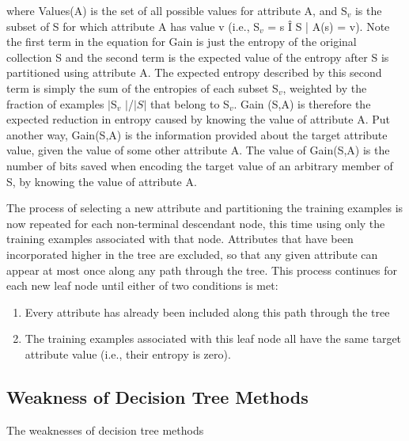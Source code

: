 \documentclass[12pt]{report}
\begin{document}
where Values(A) is the set of all possible values for attribute A, and S$_{v}$ is the subset of S for which attribute A has value v (i.e., S$_{v}$ = {s Î S | A(s) = v}). Note the first term in the equation for Gain is just the entropy of the original collection S and the second term is the expected value of the entropy after S is partitioned using attribute A. The expected entropy described by this second term is simply the sum of the entropies of each subset S$_{v}$, weighted by the fraction of examples $|$S$_{v}$ $|$/$|S|$ that belong to S$_{v}$. Gain (S,A) is therefore the expected reduction in entropy caused by knowing the value of attribute A. Put another way, Gain(S,A) is the information provided about the target attribute value, given the value of some other attribute A. The value of Gain(S,A) is the number of bits saved when encoding the target value of an arbitrary member of S, by knowing the value of attribute A.

The process of selecting a new attribute and partitioning the training examples is now repeated for each non-terminal descendant node, this time using only the training examples associated with that node. Attributes that have been incorporated higher in the tree are excluded, so that any given attribute can appear at most once along any path through the tree. This process continues for each new leaf node until either of two conditions is met:

\begin{enumerate}
\item{Every attribute has already been included along this path through the tree}
\item{The training examples associated with this leaf node all have the same target attribute value (i.e., their entropy is zero).} 

\end{enumerate}


\subsection{Weakness of Decision Tree Methods}
The weaknesses of decision tree methods
\end{document}
